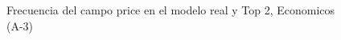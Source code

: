 \begin{figure}[H]
    \centering
    
    \caption{Frecuencia del campo  price en el modelo real y Top 2, Economicos (A-3)}
    \label{frecuency- Price-top2}
\end{figure}